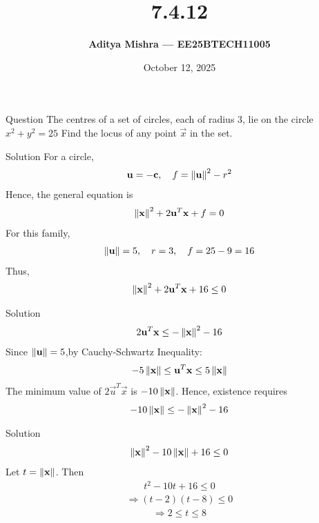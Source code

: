 \documentclass{beamer}
\title{\textbf{7.4.12}}
\author{\textbf{Aditya Mishra — EE25BTECH11005}}
\date{October 12, 2025}
\begin{document}
\begin{frame}
\titlepage
\end{frame}

\begin{frame}{Question}
The centres of a set of circles, each of radius \(3\), lie on the circle $x^2 + y^2 = 25$
Find the locus of any point \(\vec{x}\) in the set.
\end{frame}

\begin{frame}{Solution}
For a circle,
\begin{align}
\mathbf{u} = -\mathbf{c}, \quad f = \left\lVert\mathbf{u}\right\rVert^2 - r^2
\end{align}
Hence, the general equation is
\begin{align}
\left\lVert\mathbf{x}\right\rVert^2 + 2\mathbf{u}^T\mathbf{x} + f = 0
\end{align}
For this family,
\begin{align}
\left\lVert\mathbf{u}\right\rVert = 5, \quad r = 3, \quad f = 25 - 9 = 16
\end{align}
Thus,
\begin{align}
\left\lVert\mathbf{x}\right\rVert^2 + 2\mathbf{u}^T\mathbf{x} + 16 \le 0
\end{align}
\end{frame}

\begin{frame}{Solution}
\begin{align}
2\mathbf{u}^T\mathbf{x} \le -\left\lVert\mathbf{x}\right\rVert^2 - 16
\end{align}
Since \(\left\lVert\mathbf{u}\right\rVert = 5\),by Cauchy-Schwartz Inequality:
\begin{align}
-5\left\lVert\mathbf{x}\right\rVert \le \mathbf{u}^T\mathbf{x} \le 5\left\lVert\mathbf{x}\right\rVert
\end{align}
The minimum value of \(2\vec{u}^T\vec{x}\) is \(-10\left\lVert\mathbf{x}\right\rVert\).  
Hence, existence requires
\begin{align}
-10\left\lVert\mathbf{x}\right\rVert \le -\left\lVert\mathbf{x}\right\rVert^2 - 16
\end{align}
\end{frame}

\begin{frame}{Solution}
\begin{align}
\left\lVert\mathbf{x}\right\rVert^2 - 10\left\lVert\mathbf{x}\right\rVert + 16 \le 0
\end{align}
Let \(t = \left\lVert\mathbf{x}\right\rVert\). Then
\begin{align}
t^2 - 10t + 16 \le 0
\end{align}
\begin{align}
\Rightarrow (t - 2)(t - 8) \le 0
\end{align}
\begin{align}
\Rightarrow 2 \le t \le 8
\end{align}
\end{frame}
\end{document}
